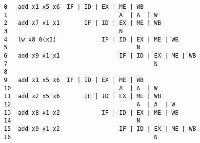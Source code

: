 \documentclass[varwidth, convert]{standalone}
\begin{document}
  \begin{BVerbatim}[]
0   add x1 x5 x6  IF | ID | EX | ME | WB
1                                A  | A  | W
2   add x7 x1 x1       IF | ID | EX | ME | WB
3                                N
4   lw x8 0(x1)             IF | ID | EX | ME | WB
5                                     N
6   add x9 x1 x1                 IF | ID | EX | ME | WB
7                                          N
8
9   add x1 x5 x6  IF | ID | EX | ME | WB
10                               A  | A  | W
11  add x2 x5 x6       IF | ID | EX | ME | WB
12                                    A  | A  | W
13  add x8 x1 x2            IF | ID | EX | ME | WB
14                                    N
15  add x9 x1 x2                 IF | ID | EX | ME | WB
16                                         N
  \end{BVerbatim}
\end{document}
